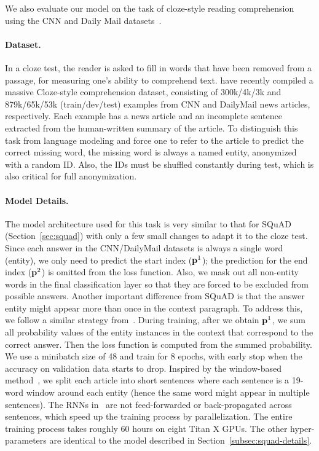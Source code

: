 We also evaluate our model on the task of cloze-style reading comprehension using the CNN and Daily Mail datasets~\citep{Hermann2015TeachingMT}.


\paragraph{Dataset.}
In a cloze test, the reader is asked to fill in words that have been removed from a passage, for measuring one's ability to comprehend text. \citet{Hermann2015TeachingMT} have recently compiled a massive Cloze-style comprehension dataset, consisting of 300k/4k/3k and 879k/65k/53k (train/dev/test) examples from CNN and DailyMail news articles, respectively. Each example has a news article and an incomplete sentence extracted from the human-written summary of the article. To distinguish this task from language modeling and force one to refer to the article to predict the correct missing word, the missing word is always a named entity, anonymized with a random ID. 
Also, the IDs must be shuffled constantly during test, which is also critical for full anonymization.

\paragraph{Model Details.}\label{subsec:cnn-details}
The model architecture used for this task is very similar to that for SQuAD (Section~\ref{sec:squad}) with only a few small changes to adapt it to the cloze test. 
Since each answer in the CNN/DailyMail datasets is always a single word (entity), we only need to predict the start index (${\bf p}^1$); the prediction for the end index (${\bf p}^2$) is omitted from the loss function. 
Also, we mask out all non-entity words in the final classification layer so that they are forced to be excluded from possible answers. Another important difference from SQuAD is that the answer entity might appear more than once in the context paragraph. %
To address this, we follow a similar strategy from~\cite{kadlec2016text}. 
During training, after we obtain ${\bf p}^1$, we sum all probability values of the entity instances in the context that correspond to the correct answer. 
Then the loss function is computed from the summed probability.
We use a minibatch size of 48 and train for 8 epochs, with early stop when the accuracy on validation data starts to drop. 
Inspired by the window-based method~\citep{hill2015goldilocks}, 
we split each article into short sentences where each sentence is a 19-word window around each entity (hence the same word might appear in multiple sentences).
The RNNs in \sysshort\ are not feed-forwarded or back-propagated across sentences, which speed up the training process by parallelization.
The entire training process takes roughly 60 hours on eight Titan X GPUs. The other hyper-parameters are identical to the model described in Section~\ref{subsec:squad-details}.


